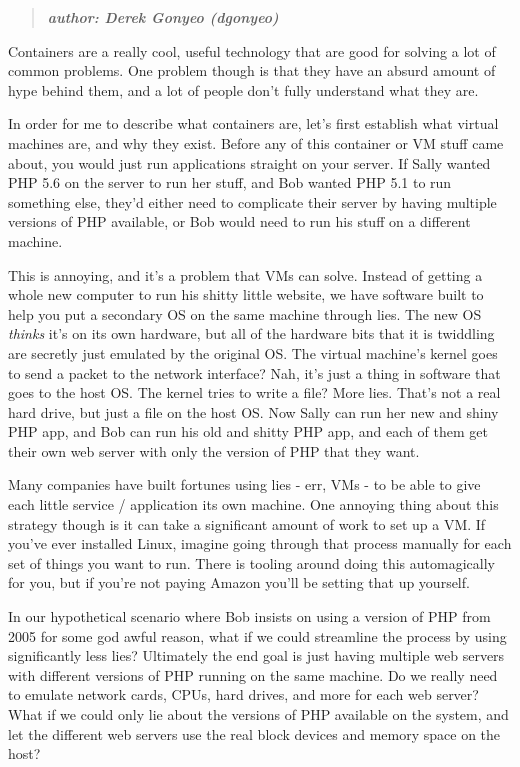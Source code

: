 \documentclass[9pt]{extarticle} %
\begin{document}
\begin{minipage}[t]{.66\linewidth} %
\vspace{-0.4cm}
\hypertarget{firstnews}{}
\begin{quote}
\centering
\textbf{\textit{author: Derek Gonyeo (dgonyeo)}}
\end{quote}
	
Containers are a really cool, useful technology that are good for solving a lot
of common problems. One problem though is that they have an absurd amount of 
hype behind them, and a lot of people don't fully understand what they are. 

In order for me to describe what containers are, let's first establish what
virtual machines are, and why they exist. Before any of this container or VM
stuff came about, you would just run applications straight on your server. 
If Sally wanted PHP 5.6 on the server to run her stuff, and Bob wanted PHP 5.1
to run something else, they'd either need to complicate their server by having multiple versions of PHP available, or Bob would need to run his stuff on a different machine.

This is annoying, and it's a problem that VMs can solve. Instead of getting a
whole new computer to run his shitty little website, we have software built to
help you put a secondary OS on the same machine through lies. The new OS
\textit{thinks} it's on its own hardware, but all of the hardware bits that
it is twiddling are secretly just emulated by the original OS. The virtual
machine's kernel goes to send a packet to the network interface? Nah, it's 
just a thing in software that goes to the host OS. The kernel tries to write a
file? More lies. That's not a real hard drive, but just a file on the host OS. 
Now Sally can run her new and shiny PHP app, and Bob can run his old and shitty
PHP app, and each of them get their own web server with only the version of PHP
that they want.

Many companies have built fortunes using lies - err, VMs - to be able to give
each little service / application its own machine. One annoying thing about
this strategy though is it can take a significant amount of work to set up a
VM. If you've ever installed Linux, imagine going through that process manually
for each set of things you want to run. There is tooling around doing this
automagically for you, but if you're not paying Amazon you'll be setting that
up yourself.

In our hypothetical scenario where Bob insists on using a version of PHP from
2005 for some god awful reason, what if we could streamline the process by
using significantly less lies? Ultimately the end goal is just having multiple
web servers with different versions of PHP running on the same machine. Do we
really need to emulate network cards, CPUs, hard drives, and more for each web
server? What if we could only lie about the versions of PHP available on the
system, and let the different web servers use the real block devices and memory
space on the host?


\end{minipage}
\end{document}
